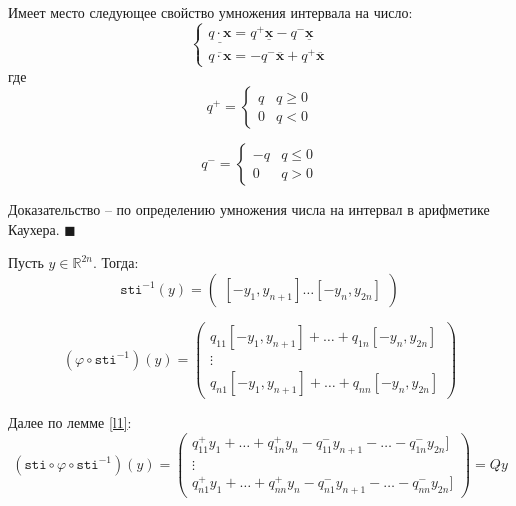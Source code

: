 \begin{lemma} \label{l1} \cite[стр. 583]{shary}
	Имеет место следующее свойство умножения интервала на число:
	\begin{equation}
	\begin{cases}
	\underline{q \cdot \textbf{x}} = q^+\underline{\textbf{x}} - q^-\underline{\textbf{x}} \\
	
	\overline{q \cdot \textbf{x}} = -q^-\overline{\textbf{x}} + q^+\overline{\textbf{x}}
	\end{cases}
	\end{equation}
	где
	\begin{equation}
	q^+ =
	\begin{cases}
	q & q \geq 0 \\
	0 & q < 0
	\end{cases}
	\end{equation}
	
	\begin{equation}
	q^- =
	\begin{cases}
	-q & q \leq 0 \\
	0 & q > 0
	\end{cases}
	\end{equation}
	
	Доказательство -- по определению умножения числа на интервал в арифметике Каухера.
	$\blacksquare$
\end{lemma}

Пусть $y \in \mathbb{R}^{2n}$.
Тогда:
\begin{equation}
\mathtt{sti}^{-1}(y)=
\begin{pmatrix}
[-y_1, y_{n + 1}] \dots [-y_n, y_{2n}]
\end{pmatrix}
\end{equation}

\begin{equation}
(\varphi \circ \mathtt{sti}^{-1})(y)=
\begin{pmatrix}
q_{11}[-y_1, y_{n + 1}] + \dots + q_{1n} [-y_n, y_{2n}] \\
\vdots \\
q_{n1}[-y_1, y_{n + 1}] + \dots + q_{nn} [-y_n, y_{2n}]
\end{pmatrix}
\end{equation}

Далее по лемме \ref{l1}:
\begin{equation}
(\mathtt{sti} \circ \varphi \circ \mathtt{sti}^{-1})(y)=
\begin{pmatrix}
q_{11}^+y_1 + \dots + q_{1n}^+ y_n - q_{11}^-y_{n+1} - \dots - q_{1n}^- y_{2n}] \\
\vdots \\
q_{n1}^+y_1 + \dots + q_{nn}^+ y_n - q_{n1}^-y_{n+1} - \dots - q_{nn}^- y_{2n}]
\end{pmatrix}
=
Q\tilde{ }y
\end{equation}

